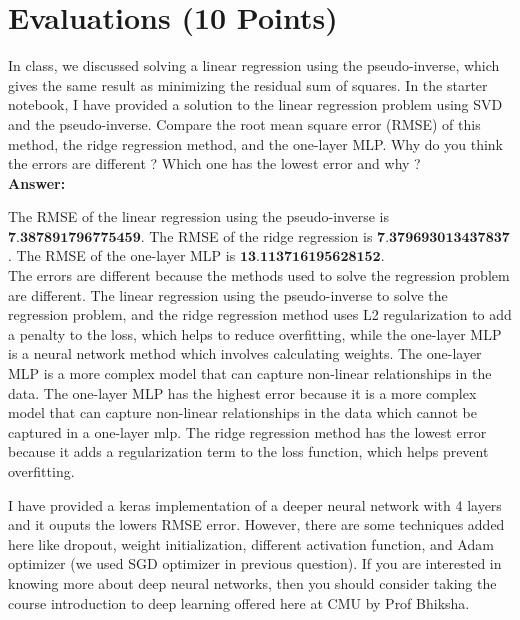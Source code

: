 \documentclass{article}
\begin{document}
\section{Evaluations (10 Points)}
In class, we discussed solving a linear regression using the pseudo-inverse, which gives the same result as minimizing the residual sum of squares. In the starter notebook, I have provided a solution to the linear regression problem using SVD and the pseudo-inverse. Compare the root mean square error (RMSE) of this method, the ridge regression method, and the one-layer MLP. Why do you think the errors are different ?
Which one has the lowest error and why ?
\[\]
\textbf{Answer:}

The RMSE of the linear regression using the pseudo-inverse is \(\textbf{7.387891796775459}\).
The RMSE of the ridge regression is $\textbf{7.379693013437837}$.
The RMSE of the one-layer MLP is $\textbf{13.113716195628152}$.
\[
\]
The errors are different because the methods used to solve the regression problem are different. The linear regression using the pseudo-inverse  to solve the regression problem, and the ridge regression method uses L2 regularization to add a penalty to the loss, which helps to reduce overfitting, while the one-layer MLP is a neural network method which involves calculating weights. The one-layer MLP is a more complex model that can capture non-linear relationships in the data. The one-layer MLP has the highest error because it is a more complex model that can capture non-linear relationships in the data which cannot be captured in a one-layer mlp. The ridge regression method has the lowest error because it adds a regularization term to the loss function, which helps prevent overfitting.
\[
\]


I have provided a keras implementation of a deeper neural network with 4 layers and it ouputs the lowers
RMSE error. However, there are some techniques added here like dropout, weight initialization, different
activation function, and Adam optimizer (we used SGD optimizer in previous question). If you are interested
in knowing more about deep neural networks, then you should consider taking the course introduction to
deep learning offered here at CMU by Prof Bhiksha.
\end{document}
